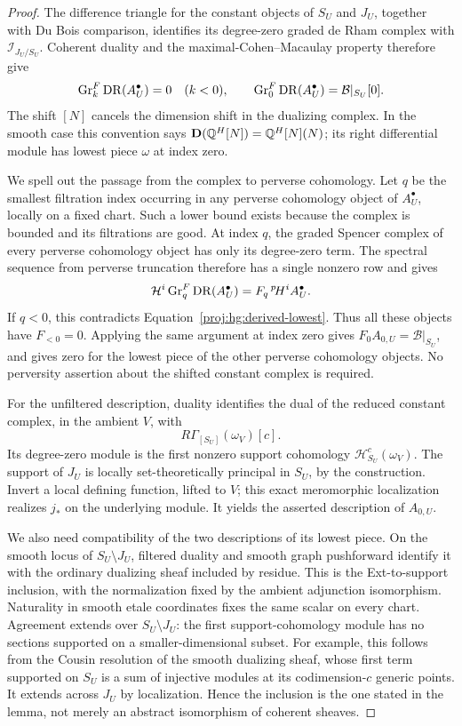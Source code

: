 \begin{proof}
The difference triangle for the constant objects of \(S_U\) and
\(J_U\), together with Du Bois comparison, identifies its
degree-zero graded de Rham complex with
\(\mathcal I_{J_U/S_U}\).  Coherent duality and the
maximal-Cohen--Macaulay property therefore give
\begin{equation}\label{proj:hg:derived-lowest}
 \operatorname{Gr}^F_k\operatorname{DR}(A^\bullet_U)=0\quad(k<0),
 \qquad
 \operatorname{Gr}^F_0\operatorname{DR}(A^\bullet_U)=\mathcal B|_{S_U}[0].
\end{equation}
The shift \([N]\) cancels the dimension shift in the dualizing
complex.  In the smooth case this convention says
\(\mathbf D(\mathbb{Q}^H[N])=\mathbb{Q}^H[N](N)\); its right differential module
has lowest piece \(\omega\) at index zero.

We spell out the passage from the complex to perverse cohomology.
Let \(q\) be the smallest filtration index occurring in any
perverse cohomology object of \(A^\bullet_U\), locally on a fixed
chart.  Such a lower bound exists because the complex is bounded
and its filtrations are good.  At index \(q\), the graded Spencer
complex of every perverse cohomology object has only its
degree-zero term.  The spectral sequence from perverse truncation
therefore has a single nonzero row and gives
\[
 \mathcal H^i\operatorname{Gr}^F_q\operatorname{DR}(A^\bullet_U)
   =F_q\,{}^p\!H^iA^\bullet_U.
\]
If \(q<0\), this contradicts Equation~\eqref{proj:hg:derived-lowest}.
Thus all these objects have \(F_{<0}=0\).  Applying the same
argument at index zero gives \(F_0A_{0,U}=\mathcal B|_{S_U}\),
and gives zero for the lowest piece of the other perverse
cohomology objects.  No perversity assertion about the shifted
constant complex is required.

For the unfiltered description, duality identifies the dual of the
reduced constant complex, in the ambient \(V\), with
\[
 R\Gamma_{[S_U]}(\omega_V)[c].
\]
Its degree-zero module is the first nonzero support cohomology
\(\mathcal H^c_{S_U}(\omega_V)\).  The support of \(J_U\) is locally
set-theoretically principal in \(S_U\), by the construction.
Invert a local defining function, lifted to \(V\); this exact
meromorphic localization realizes \(j_*\) on the underlying
module.  It yields the asserted description of \(A_{0,U}\).

We also need compatibility of the two descriptions of its lowest
piece.  On the smooth locus of \(S_U\setminus J_U\), filtered
duality and smooth graph pushforward identify it with the ordinary
dualizing sheaf included by residue.  This is the Ext-to-support
inclusion, with the normalization fixed by the ambient adjunction
isomorphism.  Naturality in smooth etale coordinates fixes the
same scalar on every chart.  Agreement extends over
\(S_U\setminus J_U\): the first support-cohomology module has no
sections supported on a smaller-dimensional subset.  For example,
this follows from the Cousin resolution of the smooth dualizing
sheaf, whose first term supported on \(S_U\) is a sum of injective
modules at its codimension-\(c\) generic points.  It extends across
\(J_U\) by localization.  Hence the inclusion is the one stated
in the lemma, not merely an abstract isomorphism of coherent
sheaves.


\end{proof}

